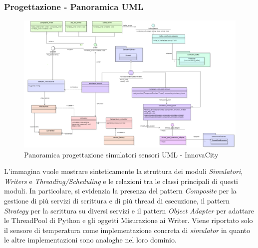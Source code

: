 \subsubsection{Progettazione - Panoramica UML }
\begin{figure}[H]
    \centering
    \includegraphics[width=1.1\textwidth]{../Images/SpecificaTecnica/progettazioneCompSimulatori.PNG}
    \caption{Panoramica progettazione simulatori sensori UML - InnovaCity}
    \label{fig: panor_sim}
\end{figure}
L'immagina vuole mostrare sinteticamente la struttura dei moduli \textit{Simulatori}, \textit{Writers} e \textit{Threading/Scheduling} e le relazioni tra le classi principali di questi moduli. In particolare, si evidenzia la presenza del pattern \textit{Composite} per la gestione di più servizi di scrittura e di più thread di esecuzione, il pattern \textit{Strategy} per la scrittura su diversi servizi e il pattern \textit{Object Adapter} per adattare le ThreadPool di Python e gli oggetti Misurazione ai Writer. 
Viene riportato solo il sensore di temperatura come implementazione concreta di \textit{simulator} in quanto le altre implementazioni sono analoghe nel loro dominio.